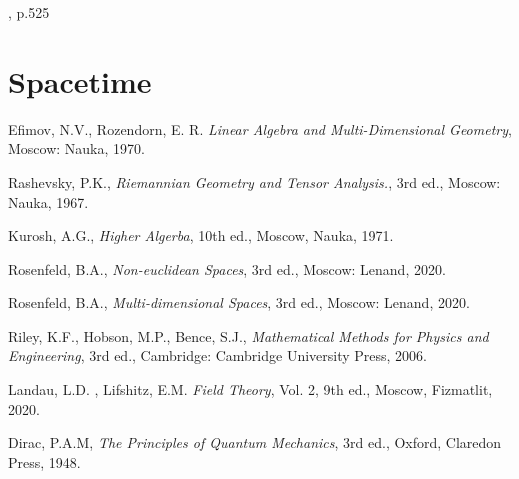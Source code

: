 \documentclass{book}
\begin{document}
\cite{rosenfeld_noneucldean}, p.525

\section{Spacetime}

\begin{thebibliography}{}
Efimov, N.V., Rozendorn, E. R. \emph{Linear Algebra and Multi-Dimensional Geometry}, Moscow: Nauka, 1970.

Rashevsky, P.K., \emph{Riemannian Geometry and Tensor Analysis.}, 3rd ed., Moscow: Nauka, 1967.
   
Kurosh, A.G., \emph{Higher Algerba}, 10th ed., Moscow, Nauka, 1971. 

   Rosenfeld, B.A.,  \emph{Non-euclidean Spaces}, 3rd ed., Moscow: Lenand, 2020.

Rosenfeld, B.A.,  \emph{Multi-dimensional Spaces}, 3rd ed., Moscow: Lenand, 2020.

Riley, K.F., Hobson, M.P., Bence, S.J., \emph{Mathematical Methods for Physics and Engineering}, 3rd ed., Cambridge: Cambridge University Press, 2006.

Landau, L.D. , Lifshitz, E.M. \emph{Field Theory}, Vol. 2, 9th ed., Moscow, Fizmatlit, 2020.

Dirac, P.A.M, \emph{The Principles of Quantum Mechanics}, 3rd ed., Oxford, Claredon Press, 1948.


\end{thebibliography}
\end{document}
